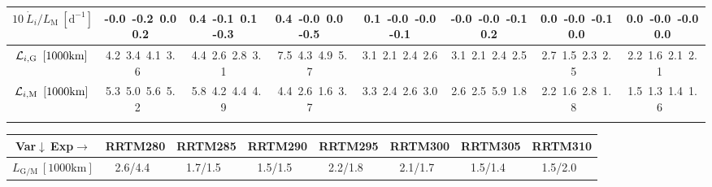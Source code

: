 \begin{table}[H]
{\begin{centering}
\begin{tabular}{|c|c|c|c|c|c|c|c|}
\hline
$10\ \dot{L}_{i}/L_{\mathrm{M}}\ \left[\mathrm{d^{-1}}\right]$ & \textcolor{C1}{-0.0}\ \textcolor{C2}{-0.2}\ \textcolor{C3}{0.0}\ \textcolor{C4}{0.2}\  & \textcolor{C1}{0.4}\ \textcolor{C2}{-0.1}\ \textcolor{C3}{0.1}\ \textcolor{C4}{-0.3}\  & \textcolor{C1}{0.4}\ \textcolor{C2}{-0.0}\ \textcolor{C3}{0.0}\ \textcolor{C4}{-0.5}\  & \textcolor{C1}{0.1}\ \textcolor{C2}{-0.0}\ \textcolor{C3}{-0.0}\ \textcolor{C4}{-0.1}\  & \textcolor{C1}{-0.0}\ \textcolor{C2}{-0.0}\ \textcolor{C3}{-0.1}\ \textcolor{C4}{0.2}\  & \textcolor{C1}{0.0}\ \textcolor{C2}{-0.0}\ \textcolor{C3}{-0.1}\ \textcolor{C4}{0.0}\  & \textcolor{C1}{0.0}\ \textcolor{C2}{-0.0}\ \textcolor{C3}{-0.0}\ \textcolor{C4}{0.0}\  \tabularnewline
\hline
${\cal L}_{i,\mathrm{G}}\ \left[1000\mathrm{km}\right]$ & \textcolor{C1}{4.2}\ \textcolor{C2}{3.4}\ \textcolor{C3}{4.1}\ \textcolor{C4}{3.6}\  & \textcolor{C1}{4.4}\ \textcolor{C2}{2.6}\ \textcolor{C3}{2.8}\ \textcolor{C4}{3.1}\  & \textcolor{C1}{7.5}\ \textcolor{C2}{4.3}\ \textcolor{C3}{4.9}\ \textcolor{C4}{5.7}\  & \textcolor{C1}{3.1}\ \textcolor{C2}{2.1}\ \textcolor{C3}{2.4}\ \textcolor{C4}{2.6}\  & \textcolor{C1}{3.1}\ \textcolor{C2}{2.1}\ \textcolor{C3}{2.4}\ \textcolor{C4}{2.5}\  & \textcolor{C1}{2.7}\ \textcolor{C2}{1.5}\ \textcolor{C3}{2.3}\ \textcolor{C4}{2.5}\  & \textcolor{C1}{2.2}\ \textcolor{C2}{1.6}\ \textcolor{C3}{2.1}\ \textcolor{C4}{2.1}\  \tabularnewline
\hline
${\cal L}_{i,\mathrm{M}}\ \left[1000\mathrm{km}\right]$ & \textcolor{C1}{5.3}\ \textcolor{C2}{5.0}\ \textcolor{C3}{5.6}\ \textcolor{C4}{5.2}\  & \textcolor{C1}{5.8}\ \textcolor{C2}{4.2}\ \textcolor{C3}{4.4}\ \textcolor{C4}{4.9}\  & \textcolor{C1}{4.4}\ \textcolor{C2}{2.6}\ \textcolor{C3}{1.6}\ \textcolor{C4}{3.7}\  & \textcolor{C1}{3.3}\ \textcolor{C2}{2.4}\ \textcolor{C3}{2.6}\ \textcolor{C4}{3.0}\  & \textcolor{C1}{2.6}\ \textcolor{C2}{2.5}\ \textcolor{C3}{5.9}\ \textcolor{C4}{1.8}\  & \textcolor{C1}{2.2}\ \textcolor{C2}{1.6}\ \textcolor{C3}{2.8}\ \textcolor{C4}{1.8}\  & \textcolor{C1}{1.5}\ \textcolor{C2}{1.3}\ \textcolor{C3}{1.4}\ \textcolor{C4}{1.6}\  \tabularnewline
\hline
 &  &  &  &  &  &  & \tabularnewline
\hline
\end{tabular}
\begin{tabular}{|c|c|c|c|c|c|c|c|}
\hline
Var$\downarrow\ $Exp$\rightarrow$ & RRTM280 & RRTM285 & RRTM290 & RRTM295 & RRTM300 & RRTM305 & RRTM310 \tabularnewline
\hline
\hline
$L_{\mathrm{G/M}}\ \left[1000\mathrm{km}\right]$ & 2.6/4.4\ & 1.7/1.5\ & 1.5/1.5\ & 2.2/1.8\ & 2.1/1.7\ & 1.5/1.4\ & 1.5/2.0\ \tabularnewline
\hline

\end{tabular}
\end{centering}}
\end{table}
